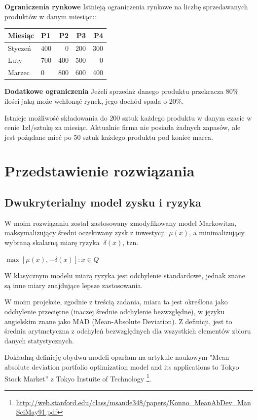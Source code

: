 \documentclass[11pt]{article} %
\begin{document}
\textbf{Ograniczenia rynkowe}
Istnieją ograniczenia rynkowe na liczbę sprzedawanych produktów w danym miesiącu:

\begin{center}
    \begin{tabular}{ | l | l | r | r | r | }
    \hline
    Miesiąc & P1 & P2 & P3 & P4 \\ \hline
    Styczeń & 400 & 0 & 200 & 300 \\
    Luty & 700 & 400 & 500 & 0 \\
    Marzec & 0 & 800 & 600 & 400 \\ \hline
    \end{tabular}
\end{center}

\textbf{Dodatkowe ograniczenia}
Jeżeli sprzedaż danego produktu przekracza 80\% ilości jaką może wchłonąć rynek, jego dochód spada o 20\%.

Istnieje możliwość składowania do 200 sztuk każdego produktu w danym czasie w cenie 1zł/sztukę za miesiąc. Aktualnie firma nie posiada żadnych zapasów, ale jest pożądane mieć po 50 sztuk każdego produktu pod koniec marca.

\section{Przedstawienie rozwiązania}

\subsection{Dwukryterialny model zysku i ryzyka}
W moim rozwiązaniu został zastosowany zmodyfikowany model Markowitza, maksymalizujący średni oczekiwany zysk z inwestycji $\ \mu(x)$, a minimalizujący wybraną skalarną miarę ryzyka $\ \delta(x)$,
tzn.

$\max{[ \mu(x), -\delta(x)] : x \in Q}$


W klasycznym modelu miarą ryzyka jest odchylenie standardowe, jednak znane są inne miary znajdujące lepsze zastosowania. 

W moim projekcie, zgodnie z treścią zadania, miara ta jest określona jako odchylenie przeciętne (inaczej średnie odchylenie bezwzględne), w języku angielskim znane jako MAD (Mean-Absolute Deviation).
Z definicji, jest to średnia arytmetyczna z odchyleń bezwzględnych dla wszystkich elementów zbioru danych statystycznych.

Dokładną definicję obydwu modeli oparłam na artykule naukowym "Mean-absolute deviation portfolio optimization model and its applications to Tokyo Stock Market'' z Tokyo Instuite of Technology
\footnote{
	\url{http://web.stanford.edu/class/msande348/papers/Konno_MeanAbDev_ManSciMay91.pdf}
}.
\end{document}
